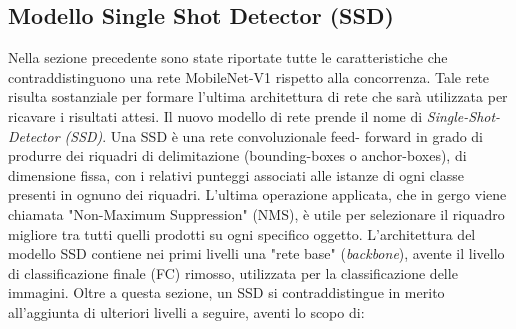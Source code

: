 \subsection{Modello Single Shot Detector (SSD)}
Nella sezione precedente sono state riportate tutte le caratteristiche che 
contraddistinguono una rete MobileNet-V1 rispetto alla concorrenza. Tale 
rete risulta sostanziale per formare l'ultima architettura di rete che sarà 
utilizzata per ricavare i risultati attesi. Il nuovo modello di rete prende il 
nome di \emph{Single-Shot-Detector (SSD)}. Una SSD è una rete convoluzionale feed-
forward in grado di produrre dei riquadri di delimitazione (bounding-boxes
 o anchor-boxes), di dimensione fissa, con i relativi punteggi associati alle 
istanze di ogni classe presenti in ognuno dei riquadri. L'ultima operazione 
applicata, che in gergo viene chiamata "Non-Maximum Suppression" (NMS), 
è utile per selezionare il riquadro migliore tra tutti quelli prodotti su ogni 
specifico oggetto. L'architettura del modello SSD contiene nei primi livelli 
una "rete base" (\emph{backbone}), avente il livello di classificazione finale (FC) 
rimosso, utilizzata per la classificazione delle immagini. Oltre a questa 
sezione, un SSD si contraddistingue in merito all'aggiunta di ulteriori livelli 
a seguire, aventi lo scopo di:
